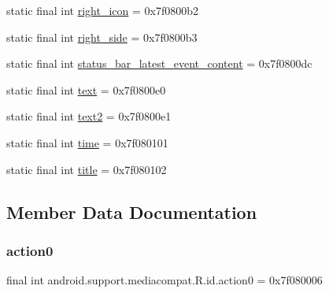 \begin{DoxyCompactItemize}
static final int \mbox{\hyperlink{classandroid_1_1support_1_1mediacompat_1_1R_1_1id_aef3074f375f1b5f9ff46fd31dc8b9dd8}{right\+\_\+icon}} = 0x7f0800b2
\item 
static final int \mbox{\hyperlink{classandroid_1_1support_1_1mediacompat_1_1R_1_1id_a4dda28736626841361621768676f8cc5}{right\+\_\+side}} = 0x7f0800b3
\item 
static final int \mbox{\hyperlink{classandroid_1_1support_1_1mediacompat_1_1R_1_1id_a1d6982da9abf7a38d286554e24eb056a}{status\+\_\+bar\+\_\+latest\+\_\+event\+\_\+content}} = 0x7f0800dc
\item 
static final int \mbox{\hyperlink{classandroid_1_1support_1_1mediacompat_1_1R_1_1id_a27977888343c802d53fd8e31094c4d46}{text}} = 0x7f0800e0
\item 
static final int \mbox{\hyperlink{classandroid_1_1support_1_1mediacompat_1_1R_1_1id_af89db6d57c69dfd896242a53693866c9}{text2}} = 0x7f0800e1
\item 
static final int \mbox{\hyperlink{classandroid_1_1support_1_1mediacompat_1_1R_1_1id_af3ae580d9965637cb4e92633f0d964ee}{time}} = 0x7f080101
\item 
static final int \mbox{\hyperlink{classandroid_1_1support_1_1mediacompat_1_1R_1_1id_a6040b8dfeb6da7cd9778754e38ed9bb3}{title}} = 0x7f080102
\end{DoxyCompactItemize}


\subsection{Member Data Documentation}
\mbox{\label{classandroid_1_1support_1_1mediacompat_1_1R_1_1id_a0d129d7ff0edd3bb3cf6a74f736656cb}} 
\subsubsection{\texorpdfstring{action0}{action0}}
{\footnotesize\ttfamily final int android.\+support.\+mediacompat.\+R.\+id.\+action0 = 0x7f080006\hspace{0.3cm}{\ttfamily [static]}}

\mbox{\label{classandroid_1_1support_1_1mediacompat_1_1R_1_1id_a89d378fa3c49f2d17cfd27b0e9109485}} 
